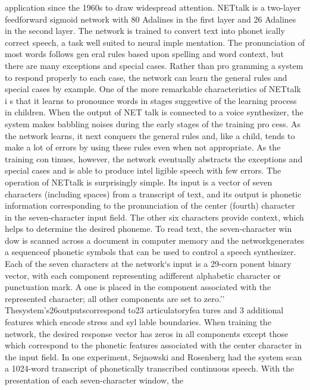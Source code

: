 \documentclass[11pt,a4paper,twocolumn]{article}
\begin{document}
application since the 1960s to draw widespread attention. 
NETtalk is a two-layer feedforward sigmoid network with 
80 Adalines in the first layer and 26 Adalines in the second 
layer. The network is trained to convert text into phonet
ically correct speech, a task well suited to neural imple
mentation. The pronunciation of most words follows gen
eral rules based upon spelling and word context, but there 
are many exceptions and special cases. Rather than pro
gramming a system to respond properly to each case, the 
network can learn the general rules and special cases by 
example. 
One of the more remarkable characteristics of NETtalk 
i s  that it learns to pronounce words in stages suggestive of 
the learning process in children. When the output of NET
talk is connected to a voice synthesizer, the system makes 
babbling noises during the early stages of the training pro
cess. As the network learns, it next conquers the general 
rules and, like a child, tends to make a lot of errors by using 
these rules even when not appropriate. As the training con
tinues, however, the network eventually abstracts the 
exceptions and special cases and is able to produce intel
ligible speech with few errors. 
The operation of NETtalk is surprisingly simple. Its input 
is a vector of seven characters (including spaces) from a 
transcript of text, and its output is phonetic information 
corresponding to the pronunciation of the center (fourth) 
character in the seven-character input field. The other six 
characters provide context, which helps to determine the 
desired phoneme. To read text, the seven-character win
dow is scanned across a document in computer memory 
and the networkgenerates a sequenceof phonetic symbols 
that can be used to control a speech synthesizer. Each of 
the seven characters at the network‘s input is a 29-corn
ponent binary vector, with each component representing 
adifferent alphabetic character or punctuation mark. A one 
is placed in the component associated with the represented 
character; all other components are set to zero.’’ 
Thesystem’s26outputscorrespond to23 articulatoryfea
tures and 3 additional features which encode stress and syl
lable boundaries. When training the network, the desired 
response vector has zeros in all components except those 
which correspond to the phonetic features associated with 
the center character in the input field. In one experiment, 
Sejnowski and Rosenberg had the system scan a 1024-word 
transcript of phonetically transcribed continuous speech. 
With the presentation of each seven-character window, the 
\end{document}
